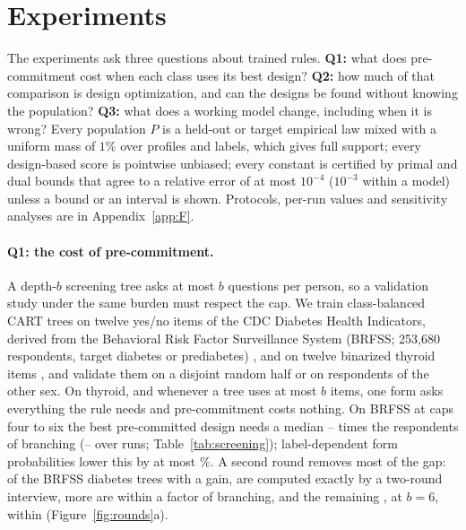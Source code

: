 \section{Experiments}\label{sec:experiments}
The experiments ask three questions about trained rules. \textbf{Q1:} what does pre-commitment cost when each class uses its best design? \textbf{Q2:} how much of that comparison is design optimization, and can the designs be found without knowing the population? \textbf{Q3:} what does a working model change, including when it is wrong? Every population $P$ is a held-out or target empirical law mixed with a uniform mass of $1\%$ over profiles and labels, which gives full support; every design-based score is pointwise unbiased; every constant is certified by primal and dual bounds that agree to a relative error of at most $10^{-4}$ ($10^{-3}$ within a model) unless a bound or an interval is shown. Protocols, per-run values and sensitivity analyses are in Appendix~\ref{app:F}.



\paragraph{Q1: the cost of pre-commitment.}
A depth-$b$ screening tree asks at most $b$ questions per person, so a validation study under the same burden must respect the cap. We train class-balanced CART trees on twelve yes/no items of the CDC Diabetes Health Indicators, derived from the Behavioral Risk Factor Surveillance System (BRFSS; 253,680 respondents, target diabetes or prediabetes) \citep{cdcdiabetes2017}, and on twelve binarized thyroid items \citep{quinlan1986thyroid}, and validate them on a disjoint random half or on respondents of the other sex. On thyroid, and whenever a tree uses at most $b$ items, one form asks everything the rule needs and pre-commitment costs nothing. On BRFSS at caps four to six the best pre-committed design needs a median \nScreenBestLo--\nScreenBestHi{} times the respondents of branching (\nScreenRunLo--\nScreenRunHi{} over runs; Table~\ref{tab:screening}); label-dependent form probabilities lower this by at most \nLabelMax\%. \nRulesSentence{} A second round removes most of the gap: of the \nScreenGainN{} BRFSS diabetes trees with a gain, \nGainComputable{} are computed exactly by a two-round interview, \nGainExactNon{} more are within a factor \nScreenTwoMax{} of branching, and the remaining \nTwoBounded, at $b=6$, within \nTwoBoundMax{} (Figure~\ref{fig:rounds}a).

